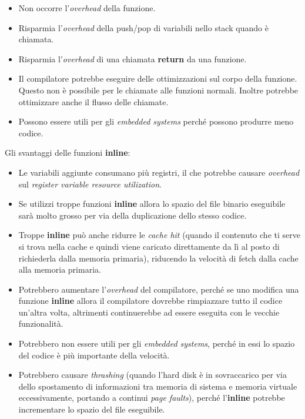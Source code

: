 \begin{itemize}
	\item \textsf{\small Non occorre l'\emph{overhead} della funzione.}
	\item \textsf{\small Risparmia l'\emph{overhead} della push/pop di variabili nello stack quando è chiamata.}
	\item \textsf{\small Risparmia l'\emph{overhead} di una chiamata \textbf{return} da una funzione.}
	\item \textsf{\small Il compilatore potrebbe eseguire delle ottimizzazioni sul corpo della funzione. Questo non è possibile per le chiamate alle funzioni normali. Inoltre potrebbe ottimizzare anche il flusso delle chiamate.}  
	\item \textsf{\small Possono essere utili per gli \emph{embedded systems} perché possono produrre meno codice.}
\end{itemize}

\textsf{\small Gli svantaggi delle funzioni \textbf{inline}: } \\

\begin{itemize}
	\item \textsf{\small Le variabili aggiunte consumano più registri, il che potrebbe causare \emph{overhead} sul \emph{register variable resource utilization}.}
	\item \textsf{\small Se utilizzi troppe funzioni \textbf{inline} allora lo spazio del file binario eseguibile sarà molto grosso per via della duplicazione dello stesso codice.}
	\item \textsf{\small Troppe \textbf{inline} può anche ridurre le \emph{cache hit} (quando il contenuto che ti serve si trova nella cache e quindi viene caricato direttamente da lì al posto di richiederla dalla memoria primaria), riducendo la velocità di fetch dalla cache alla memoria primaria.}
	\item \textsf{\small Potrebbero aumentare l'\emph{overhead} del compilatore, perché se uno modifica una funzione \textbf{inline} allora il compilatore dovrebbe rimpiazzare tutto il codice un'altra volta, altrimenti continuerebbe ad essere eseguita con le vecchie funzionalità.}
	\item \textsf{\small Potrebbero non essere utili per gli \emph{embedded systems}, perché in essi lo spazio del codice è più importante della velocità.}
	\item \textsf{\small Potrebbero causare \emph{thrashing} (quando l'hard disk è in sovraccarico per via dello spostamento di informazioni tra memoria di sistema e memoria virtuale eccessivamente, portando a continui \emph{page faults}), perché l'\textbf{inline} potrebbe incrementare lo spazio del file eseguibile.}
\end{itemize}

